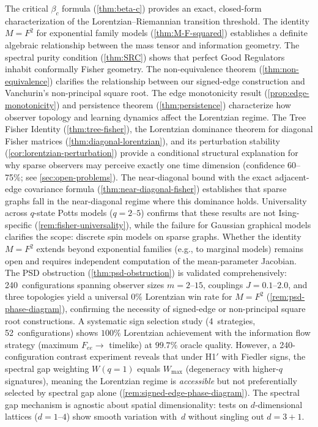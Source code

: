 \documentclass[11pt]{article}
\theoremstyle{definition}
\theoremstyle{remark}
\begin{document}
The critical $\beta_c$ formula (\cref{thm:beta-c}) provides an exact,
closed-form characterization of the Lorentzian--Riemannian transition
threshold.
The identity $M = F^2$ for exponential family models
(\cref{thm:M-F-squared}) establishes a definite algebraic relationship
between the mass tensor and information geometry.
The spectral purity condition (\cref{thm:SRC}) shows that perfect Good
Regulators inhabit conformally Fisher geometry.
The non-equivalence theorem (\cref{thm:non-equivalence}) clarifies the
relationship between our signed-edge construction and Vanchurin's
non-principal square root.
The edge monotonicity result (\cref{prop:edge-monotonicity}) and
persistence theorem (\cref{thm:persistence}) characterize how observer
topology and learning dynamics affect the Lorentzian regime.
The Tree Fisher Identity (\cref{thm:tree-fisher}), the Lorentzian
dominance theorem for diagonal Fisher matrices
(\cref{thm:diagonal-lorentzian}), and its perturbation stability
(\cref{cor:lorentzian-perturbation}) provide a conditional structural
explanation for why sparse observers may perceive exactly one time
dimension (confidence 60--75\%; see \cref{sec:open-problems}).
The near-diagonal bound with the exact adjacent-edge covariance
formula (\cref{thm:near-diagonal-fisher}) establishes that sparse
graphs fall in the near-diagonal regime where this dominance holds.
Universality across $q$-state Potts models ($q = 2$--$5$)
confirms that these results are not Ising-specific
(\cref{rem:fisher-universality}), while the failure for Gaussian
graphical models clarifies the scope: discrete spin models on sparse
graphs.
Whether the identity $M = F^2$ extends beyond exponential families
(e.g., to marginal models) remains open and requires independent
computation of the mean-parameter Jacobian.
The PSD obstruction (\cref{thm:psd-obstruction}) is validated
comprehensively: 240~configurations spanning observer sizes
$m = 2$--$15$, couplings $J = 0.1$--$2.0$, and three topologies
yield a universal $0\%$ Lorentzian win rate for $M = F^2$
(\cref{rem:psd-phase-diagram}), confirming the necessity of
signed-edge or non-principal square root constructions.
A systematic sign selection study (4~strategies, 52~configurations)
shows $100\%$ Lorentzian achievement with the information flow
strategy (maximum $F_{ee} \to$ timelike) at $99.7\%$ oracle quality.
However, a 240-configuration contrast experiment reveals that under
H1$'$ with Fiedler signs, the spectral gap weighting $W(q{=}1)$
equals $W_{\max}$ (degeneracy with higher-$q$ signatures), meaning
the Lorentzian regime is \emph{accessible} but not preferentially
selected by spectral gap alone
(\cref{rem:signed-edge-phase-diagram}).
The spectral gap mechanism is agnostic about spatial dimensionality:
tests on $d$-dimensional lattices ($d = 1$--$4$) show smooth
variation with~$d$ without singling out $d = 3 + 1$.
\end{document}
